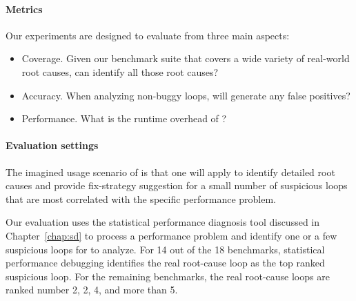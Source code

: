 \paragraph{Metrics}
Our experiments are designed to evaluate \Tool from three main aspects:
\begin{itemize}
\item Coverage. Given our benchmark suite that covers a wide variety
of real-world root causes, can \Tool identify all those root causes?
\vspace{-0.05in}

\item Accuracy. 
When analyzing non-buggy loops, will \Tool generate any false positives?
\vspace{-0.05in}

\item Performance. 
What is the runtime overhead of \Tool?
\end{itemize}

\paragraph{Evaluation settings}
The imagined usage scenario of \Tool is that one will apply \Tool to identify
detailed root causes and provide fix-strategy suggestion for a small number of
suspicious loops that are most correlated with the specific performance problem.

Our evaluation uses the statistical performance diagnosis
tool discussed in Chapter~\ref{chap:sd} to process a performance problem and identify 
one or a few suspicious loops for \Tool to analyze.
For 14 out of the 18 benchmarks, statistical performance debugging identifies the
real root-cause loop as the top ranked suspicious loop. For the remaining
benchmarks, the real root-cause loops are ranked number 2, 2, 4, and more than 5.

